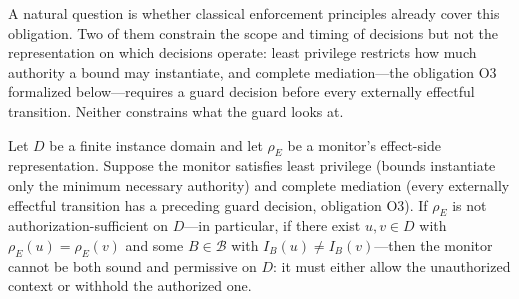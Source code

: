 %


A natural question is whether classical enforcement principles already cover
this obligation. Two of them constrain the scope and timing of decisions but
not the representation on which decisions operate: least privilege restricts
how much authority a bound may instantiate, and complete mediation---the
obligation O3 formalized below---requires a guard decision before every
externally effectful transition. Neither constrains what the guard looks at.

\begin{proposition}
\label{prop:principle-separation-effects}
Let $D$ be a finite instance domain and let $\rho_E$ be a monitor's
effect-side representation. Suppose the monitor satisfies least privilege
(bounds instantiate only the minimum necessary authority) and complete
mediation (every externally effectful transition has a preceding guard
decision, obligation O3). If $\rho_E$ is not authorization-sufficient on
$D$---in particular, if there exist $u,v\in D$ with $\rho_E(u)=\rho_E(v)$ and
some $B\in\mathcal{B}$ with $I_B(u)\neq I_B(v)$---then the monitor cannot be
both sound and permissive on $D$: it must either allow the unauthorized
context or withhold the authorized one.
\end{proposition}

